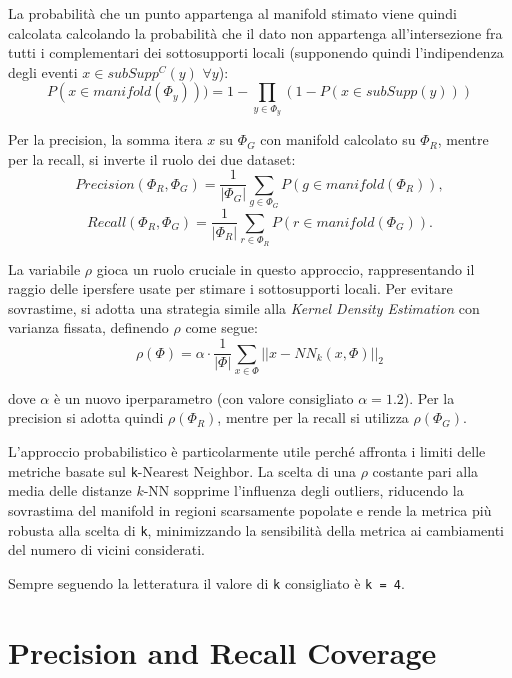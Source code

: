 La probabilità che un punto appartenga al manifold stimato viene quindi calcolata calcolando la probabilità che il dato non appartenga all'intersezione fra tutti i complementari dei sottosupporti locali
(supponendo quindi l'indipendenza degli eventi \(x \in subSupp^C(y)\) \(\forall y\)):
\begin{equation}
    P(x \in manifold(\Phi_y))) = 1 - \prod_{y \in \Phi_y} (1 - P(x \in subSupp(y)))
\end{equation}

Per la precision, la somma itera \(x\) su \(\Phi_G\) con manifold calcolato su \(\Phi_R\), mentre per la recall, si inverte il ruolo dei due dataset:
\begin{equation}
    Precision(\Phi_R, \Phi_G) = \frac{1}{|\Phi_G|} \sum_{g \in \Phi_G} P(g \in manifold(\Phi_R)),
\end{equation}
\begin{equation}
    Recall(\Phi_R, \Phi_G) = \frac{1}{|\Phi_R|} \sum_{r \in \Phi_R} P(r \in manifold(\Phi_G)).
\end{equation}

La variabile \(\rho\) gioca un ruolo cruciale in questo approccio, rappresentando il raggio delle ipersfere usate per stimare i sottosupporti locali. Per evitare sovrastime, si adotta una strategia simile alla \textit{Kernel Density Estimation} con varianza fissata, definendo \(\rho\) come segue:  
\begin{equation}
    \label{eq:rho}
    \rho(\Phi) = \alpha \cdot \frac{1}{|\Phi|} \sum_{x \in \Phi} ||x - NN_k(x, \Phi)||_2
\end{equation}

dove \(\alpha\) è un nuovo iperparametro (con valore consigliato \(\alpha = 1.2\)). Per la precision si adotta quindi \(\rho(\Phi_R)\), mentre per la recall si utilizza \(\rho(\Phi_G)\).

L'approccio probabilistico è particolarmente utile perché affronta i limiti delle metriche basate sul \texttt{k}-Nearest Neighbor. La scelta di una \(\rho\) costante pari alla media delle distanze \(k\)-NN sopprime l’influenza degli outliers, riducendo la sovrastima del manifold in regioni scarsamente popolate 
e rende la metrica più robusta alla scelta di \texttt{k}, minimizzando la sensibilità della metrica ai cambiamenti del numero di vicini considerati.  

Sempre seguendo la letteratura il valore di \texttt{k} consigliato è \texttt{k = 4}.

\section{Precision and Recall Coverage}
\label{sec:precision-and-recall-coverage}

